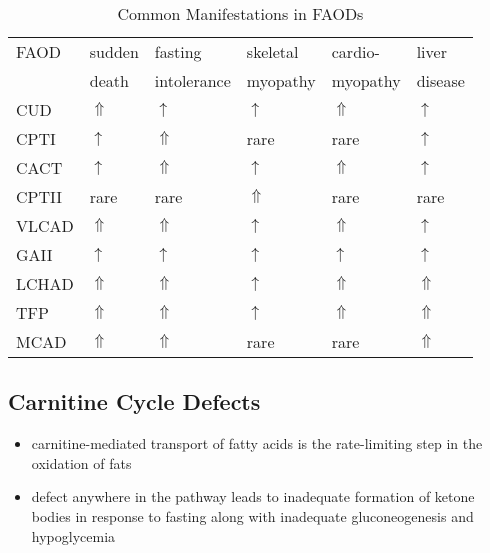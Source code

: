 \documentclass[12pt]{scrartcl}
\begin{document}
\begin{table}[htbp]
\caption{\label{tab:orgf5c9726}Common Manifestations in FAODs}
\centering
\begin{tabular}{llllll}
FAOD & sudden & fasting & skeletal & cardio- & liver\\
 & death & intolerance & myopathy & myopathy & disease\\
\hline
CUD & \(\Uparrow\) & \(\uparrow\) & \(\uparrow\) & \(\Uparrow\) & \(\uparrow\)\\
CPTI & \(\uparrow\) & \(\Uparrow\) & rare & rare & \(\uparrow\)\\
CACT & \(\uparrow\) & \(\Uparrow\) & \(\uparrow\) & \(\Uparrow\) & \(\uparrow\)\\
CPTII & rare & rare & \(\Uparrow\) & rare & rare\\
VLCAD & \(\Uparrow\) & \(\Uparrow\) & \(\uparrow\) & \(\Uparrow\) & \(\uparrow\)\\
GAII & \(\uparrow\) & \(\uparrow\) & \(\uparrow\) & \(\uparrow\) & \(\uparrow\)\\
LCHAD & \(\Uparrow\) & \(\Uparrow\) & \(\uparrow\) & \(\Uparrow\) & \(\Uparrow\)\\
TFP & \(\Uparrow\) & \(\Uparrow\) & \(\uparrow\) & \(\Uparrow\) & \(\Uparrow\)\\
MCAD & \(\Uparrow\) & \(\Uparrow\) & rare & rare & \(\Uparrow\)\\
\end{tabular}
\end{table}

\subsection{Carnitine Cycle Defects}
\label{sec:org0429efc}
\begin{itemize}
\item carnitine-mediated transport of fatty acids is the rate-limiting
step in the oxidation of fats
\item defect anywhere in the pathway leads to inadequate formation of
ketone bodies in response to fasting along with inadequate
gluconeogenesis and hypoglycemia
\end{itemize}
\end{document}
